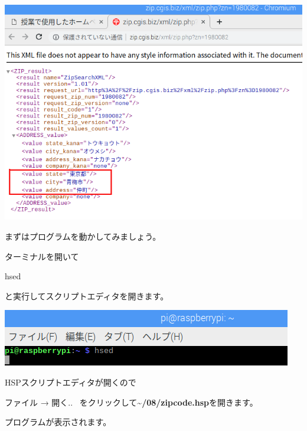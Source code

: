 \begin{center}
\includegraphics[width=15.492cm]{./text08-img/textbook-img055.png}

\end{center}
\clearpage
まずはプログラムを動かしてみましょう。

ターミナルを開いて

hsed

と実行してスクリプトエディタを開きます。



\begin{center}
\includegraphics[width=\textwidth]{./text08-img/textbook-img013.png}

\end{center}
HSPスクリプトエディタが開くので

ファイル → 開く..
\ をクリックして\textbf{{\textasciitilde}/08/zipcode.hsp}を開きます。

プログラムが表示されます。



